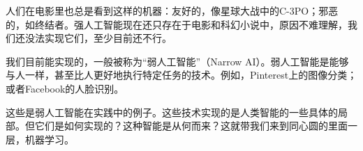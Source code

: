 \documentclass[a4paper,12pt]{ctexbook}
\begin{document}
人们在电影里也总是看到这样的机器：友好的，像星球大战中的C-3PO；邪恶的，如终结者。强人工智能现在还只存在于电影和科幻小说中，原因不难理解，我们还没法实现它们，至少目前还不行。

我们目前能实现的，一般被称为“弱人工智能”（Narrow AI）。弱人工智能是能够与人一样，甚至比人更好地执行特定任务的技术。例如，Pinterest上的图像分类；或者Facebook的人脸识别。

这些是弱人工智能在实践中的例子。这些技术实现的是人类智能的一些具体的局部。但它们是如何实现的？这种智能是从何而来？这就带我们来到同心圆的里面一层，机器学习。











\end{document}

